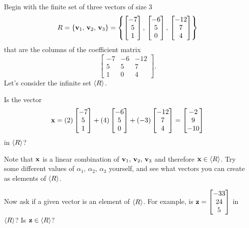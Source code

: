 \documentclass{ximera}
\begin{document}
\begin{example}
  Begin with the finite set of three vectors of size $3$
  \[
    R=\{\mathbf{v}_1,\,\mathbf{v}_2,\,\mathbf{v}_3\}
    =\left\{
      \begin{bmatrix}-7\\5\\1\end{bmatrix},\,\begin{bmatrix}-6\\5\\0\end{bmatrix},\,\begin{bmatrix}-12\\7\\4\end{bmatrix}
    \right\}
  \]
  that are the columns of the coefficient matrix
  \[
    \begin{bmatrix}
      -7&-6&- 12\\
      5&5&7\\
      1&0&4
    \end{bmatrix}.
  \]
  Let's consider the infinite set $\left\langle R\right\rangle$.

  \begin{question}
    Is the vector
    \[
      \mathbf{x}=(2)\begin{bmatrix}-7\\5\\1\end{bmatrix}+(4)\begin{bmatrix}-6\\5\\0\end{bmatrix}+(-3)\begin{bmatrix}-12\\7\\4\end{bmatrix}=
      \begin{bmatrix}-2\\9\\-10\end{bmatrix}
    \]
    in $\left\langle R\right\rangle$?

    \begin{multipleChoice}
    \end{multipleChoice}
    
    \begin{feedback}[correct]
      Note that $\mathbf{x}$ is a linear combination of
      $\mathbf{v}_1,\,\mathbf{v}_2,\,\mathbf{v}_3$ and therefore
      $\mathbf{x}\in\left\langle R\right\rangle$.  Try some different values of
      $\alpha_1,\,\alpha_2,\,\alpha_3$ yourself, and see what vectors
      you can create as elements of $\left\langle R\right\rangle$.

      \begin{question}
        Now ask if a given vector is an element of $\left\langle R\right\rangle$.  For
        example, is $\mathbf{z}=\begin{bmatrix}-33\\24\\5\end{bmatrix}$ in $\left\langle R\right\rangle$?  Is
        $\mathbf{z}\in\left\langle R\right\rangle$?
        \begin{multipleChoice}
        \end{multipleChoice}


\end{question}
\end{feedback}
\end{question}
\end{example}
\end{document}

